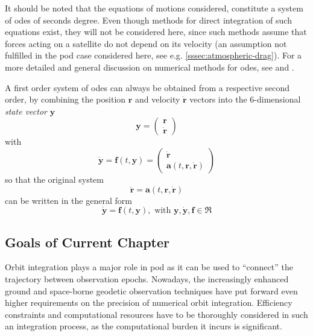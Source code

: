 It should be noted that the equations of motions considered, constitute a system 
of \glspl{ode} of seconds degree. Even though methods for direct integration of 
such equations exist, they will not be considered here, since such methods assume 
that forces acting on a satellite do not depend on its velocity (an assumption not 
fulfilled in the \gls{pod} case considered here, see e.g. \autoref{sssec:atmospheric-drag}).
For a more detailed and general discussion on numerical methods for \glspl{ode}, 
see \cite{Hairer2009I} and \cite{Hairer2010II}.

A first order system of \glspl{ode} can always be obtained from a respective second 
order, by combining the position $\bm{r}$ and velocity $\bm{\dot{r}}$ vectors into 
the 6-dimensional \emph{state vector} $\bm{y}$
\begin{equation}
    \bm{y} = \begin{pmatrix}\bm{r}\\ \bm{\dot{r}} \end{pmatrix}
\end{equation}
with 
\begin{equation}
    \bm{\dot{y}} = \bm{f}(t,\bm{y}) = 
      \begin{pmatrix}\bm{\dot{r}} \\ 
      \bm{a}(t, \bm{r}, \bm{\dot{r}}) \end{pmatrix}
\end{equation}
so that the original system
\begin{equation}
    \bm{\ddot{r}} = \bm{a}(t, \bm{r}, \bm{\dot{r}})
\end{equation}
can be written in the general form
\begin{equation}\label{eq:genode0}
    \bm{\dot{y}} = \bm{f}(t,\bm{y}), \text{ with } \bm{y}, \bm{\dot{y}}, \bm{f} \in \Re
\end{equation}

\subsection{Goals of Current Chapter}\label{ssec:goals-of-integrator}

Orbit integration plays a major role in \gls{pod} as it can be used to ``connect'' 
the trajectory between observation epochs. Nowadays, the increasingly enhanced 
ground and space-borne geodetic observation techniques have put forward even higher 
requirements on the precision of numerical orbit integration. Efficiency 
constraints and computational resources have to be thoroughly considered in such 
an integration process, as the computational burden it incurs is significant.

